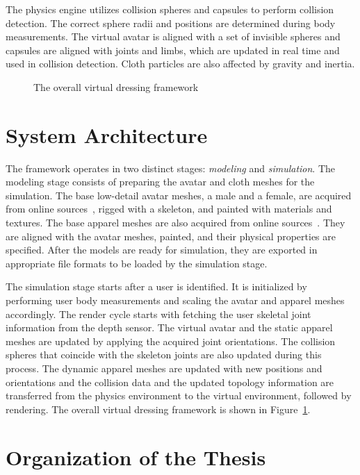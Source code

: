 The physics engine utilizes collision spheres and capsules to perform collision detection. The correct sphere radii and positions are determined during body measurements. The virtual avatar is aligned with a set of invisible spheres and capsules are aligned with joints and limbs, which are updated in real time and used in collision detection. Cloth particles are also affected by gravity and inertia.

\begin{figure}[h]
\centerline{}
\caption{The overall virtual dressing framework}
\label{fig:overall}
\end{figure}

\section{System Architecture}

The framework operates in two distinct stages: {\em modeling} and {\em simulation}. The modeling stage consists of preparing the avatar and cloth meshes for the simulation. The base low-detail avatar meshes, a male and a female, are acquired from online sources~\cite{Mmava2012,Gomer2013}, rigged with a skeleton, and painted with materials and textures. The base apparel meshes are also acquired from online sources~\cite{LadyJewell2012,3dregenerator2013,Axel2013,Borodin2013,PS3D2013,Alperin2013}. They are aligned with the avatar meshes, painted, and their physical properties are specified. After the models are ready for simulation, they are exported in appropriate file formats to be loaded by the simulation stage. 

The simulation stage starts after a user is identified. It is initialized by performing user body measurements and scaling the avatar and apparel meshes accordingly. The render cycle starts with fetching the user skeletal joint information from the depth sensor. The virtual avatar and the static apparel meshes are updated by applying the acquired joint orientations. The collision spheres that coincide with the skeleton joints are also updated during this process. The dynamic apparel meshes are updated with new positions and orientations and the collision data and the updated topology information are transferred from the physics environment to the virtual environment, followed by rendering. The overall virtual dressing framework is shown in Figure~\ref{fig:overall}.  


\section{Organization of the Thesis}

